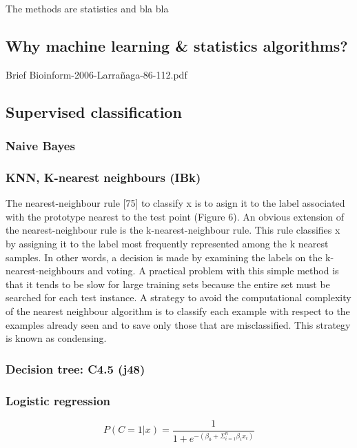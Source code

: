 \documentclass[conference,a4paper]{IEEEtran}
\begin{document}
The methods are statistics and bla bla

\subsection{Why machine learning \& statistics algorithms?}

Brief Bioinform-2006-Larrañaga-86-112.pdf

\subsection{Supervised classification}

\subsubsection{Naive Bayes}

\subsubsection{KNN, K-nearest neighbours (IBk)}

The nearest-neighbour rule [75] to classify x is to asign it to the label associated with the prototype nearest to the test point (Figure 6). An obvious extension of the nearest-neighbour rule is the k-nearest-neighbour rule. This rule classifies x by assigning it to the label most frequently represented among the k nearest samples. In other words, a decision is made by examining the labels on the k-nearest-neighbours and voting.
A practical problem with this simple method is that it tends to be slow for large training sets because the entire set must be searched for each test instance. A strategy to avoid the computational complexity of the nearest neighbour algorithm is to classify each example with respect to the examples already seen and to save only those that are misclassified. This strategy is known as condensing.

\subsubsection{Decision tree: C4.5 (j48)}



\subsubsection{Logistic regression}


\begin{equation}
	P(C = 1 | x) = \frac{1}{1 + e^{-(\beta_{0} + \Sigma^{n}_{i=1} \beta_{i} x_{i})}}
	\label{eq:logistic}
\end{equation}
\end{document}
